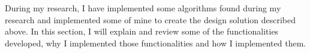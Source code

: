 During my research, I have implemented some algorithms found during my research and implemented some of mine to create the design solution described above. In this section, I will explain and review some of the functionalities developed, why I implemented those functionalities and how I implemented them.